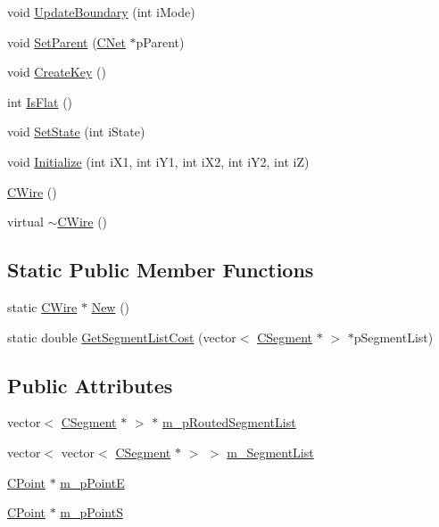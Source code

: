 \begin{DoxyCompactItemize}
\item 
void \mbox{\hyperlink{classCWire_a2f7cf29379c4f0a57e0c08e321cb25a2}{Update\+Boundary}} (int i\+Mode)
\item 
void \mbox{\hyperlink{classCWire_a5eecb0e93a2609930901b265ed4fc3de}{Set\+Parent}} (\mbox{\hyperlink{classCNet}{C\+Net}} $\ast$p\+Parent)
\item 
void \mbox{\hyperlink{classCWire_a6ed15ca71f29273eed927d88c87535b0}{Create\+Key}} ()
\item 
int \mbox{\hyperlink{classCWire_a94140b0fd930f03e8a4a5a2988469987}{Is\+Flat}} ()
\item 
void \mbox{\hyperlink{classCWire_aa21e8506c023f4c32481eaccdfeccc2e}{Set\+State}} (int i\+State)
\item 
void \mbox{\hyperlink{classCWire_ab32c9734c1bb70f9aecb90be922d63fe}{Initialize}} (int i\+X1, int i\+Y1, int i\+X2, int i\+Y2, int iZ)
\item 
\mbox{\hyperlink{classCWire_aaedab9ea265619eef584b208c675fdd3}{C\+Wire}} ()
\item 
virtual \mbox{\hyperlink{classCWire_add9cbb4215373042a505db6330fbcb6c}{$\sim$\+C\+Wire}} ()
\end{DoxyCompactItemize}
\subsection*{Static Public Member Functions}
\begin{DoxyCompactItemize}
\item 
static \mbox{\hyperlink{classCWire}{C\+Wire}} $\ast$ \mbox{\hyperlink{classCWire_ad3c0d423ef6dc81227d3e16803b1cf17}{New}} ()
\item 
static double \mbox{\hyperlink{classCWire_a1ae9fcc1cce6786baafc20dd4adb27c0}{Get\+Segment\+List\+Cost}} (vector$<$ \mbox{\hyperlink{classCSegment}{C\+Segment}} $\ast$ $>$ $\ast$p\+Segment\+List)
\end{DoxyCompactItemize}
\subsection*{Public Attributes}
\begin{DoxyCompactItemize}
\item 
vector$<$ \mbox{\hyperlink{classCSegment}{C\+Segment}} $\ast$ $>$ $\ast$ \mbox{\hyperlink{classCWire_aa9057c6d278c38fd01241ee802427243}{m\+\_\+p\+Routed\+Segment\+List}}
\item 
vector$<$ vector$<$ \mbox{\hyperlink{classCSegment}{C\+Segment}} $\ast$ $>$ $>$ \mbox{\hyperlink{classCWire_ab9e216e49ec590f52cc9a8b45cdf6445}{m\+\_\+\+Segment\+List}}
\item 
\mbox{\hyperlink{classCPoint}{C\+Point}} $\ast$ \mbox{\hyperlink{classCWire_a8d68a6a04afcb64c8447d17b8eb8a890}{m\+\_\+p\+PointE}}
\item 
\mbox{\hyperlink{classCPoint}{C\+Point}} $\ast$ \mbox{\hyperlink{classCWire_a1e90e0849093c7533aaa1b73deae66e2}{m\+\_\+p\+PointS}}
\end{DoxyCompactItemize}

